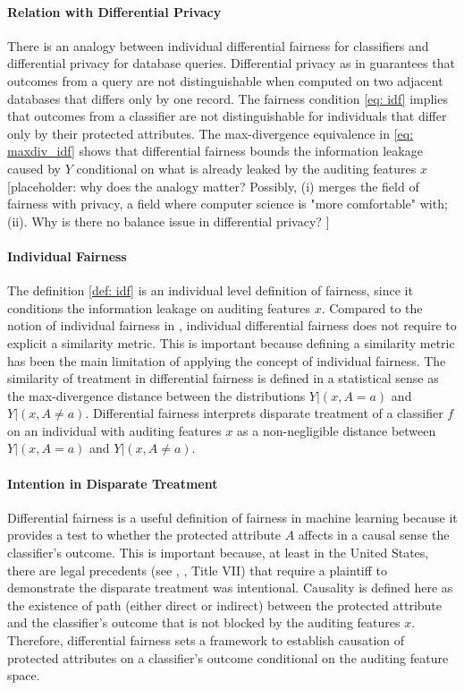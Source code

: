 \documentclass{article}
\begin{document}
\paragraph{Relation with Differential Privacy}
There is an analogy between individual differential fairness for classifiers and differential privacy for database queries. Differential privacy as in  \cite{dwork2014algorithmic} guarantees that outcomes from a query are not distinguishable when computed on two adjacent databases that differs only by one record. The fairness condition \eqref{eq: idf} implies that outcomes from a classifier are not distinguishable for individuals that differ only by their protected attributes. The max-divergence equivalence in \ref{eq: maxdiv_idf} shows that differential fairness bounds the information leakage caused by $Y$ conditional on what is already leaked by the auditing features $x$ [placeholder: why does the analogy matter? Possibly, (i) merges the field of fairness with privacy, a field where computer science is "more comfortable" with; (ii). Why is there no balance issue in differential privacy? ] 


\paragraph{Individual Fairness}
The definition \ref{def: idf} is an individual level definition of fairness, since it conditions the information leakage on auditing features $x$. Compared to the notion of individual fairness in \cite{dwork2012fairness}, individual differential fairness does not require to explicit a similarity metric. This is important because defining a similarity metric has been the main limitation of applying the concept of individual fairness. The similarity of treatment in differential fairness is defined in a statistical sense as the max-divergence distance between the distributions $Y|(x, A=a)$ and $Y|(x, A\neq a)$. Differential fairness interprets disparate treatment of a classifier $f$ on an individual with auditing features $x$ as a non-negligible distance between $Y|(x, A=a)$ and $Y|(x, A\neq a)$. 

\paragraph{Intention in Disparate Treatment}
Differential fairness is a useful definition of fairness in machine learning because it provides a test to whether the protected attribute $A$ affects in a causal sense the classifier's outcome. This is important because, at least in the United States, there are legal precedents (see \cite{Ricci}, \cite{Loomis}, Title VII) that require a plaintiff to demonstrate the disparate treatment was intentional. Causality is defined here as the existence of path (either direct or indirect) between the protected attribute and the classifier's outcome that is not blocked by the auditing features $x$. Therefore, differential fairness sets a framework to establish causation of protected attributes on a classifier's outcome conditional on the auditing feature space. 
\end{document}
